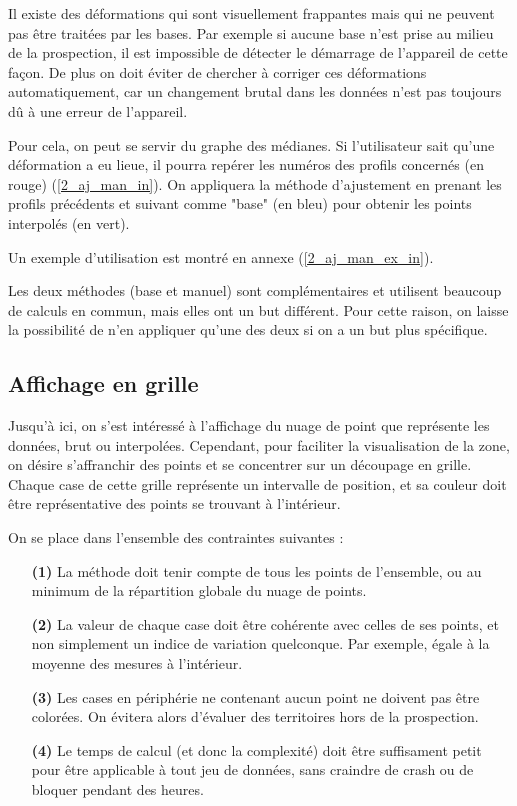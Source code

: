 \documentclass[12pt]{article}
\begin{document}
    Il existe des déformations qui sont visuellement frappantes mais qui ne peuvent pas être traitées par les bases. Par exemple si aucune base n'est prise au milieu de la prospection, il est impossible de détecter le démarrage de l'appareil de cette façon. De plus on doit éviter de chercher à corriger ces déformations automatiquement, car un changement brutal dans les données n'est pas toujours dû à une erreur de l'appareil.

    \label{2_aj_man_out} Pour cela, on peut se servir du graphe des médianes. Si l'utilisateur sait qu'une déformation a eu lieue, il pourra repérer les numéros des profils concernés (en rouge) (\ref{2_aj_man_in}). On appliquera la méthode d'ajustement en prenant les profils précédents et suivant comme "base" (en bleu) pour obtenir les points interpolés (en vert).

    \label{2_aj_man_ex_out} Un exemple d'utilisation est montré en annexe (\ref{2_aj_man_ex_in}).

    Les deux méthodes (base et manuel) sont complémentaires et utilisent beaucoup de calculs en commun, mais elles ont un but différent. Pour cette raison, on laisse la possibilité de n'en appliquer qu'une des deux si on a un but plus spécifique.

\newpage
\subsection{Affichage en grille}\label{2-3}

    Jusqu'à ici, on s'est intéressé à l'affichage du nuage de point que représente les données, brut ou interpolées. Cependant, pour faciliter la visualisation de la zone, on désire s'affranchir des points et se concentrer sur un découpage en grille. Chaque case de cette grille représente un intervalle de position, et sa couleur doit être représentative des points se trouvant à l'intérieur.

    On se place dans l'ensemble des contraintes suivantes :
    \begin{enumerate}
        \item[\textbf{(1)}] La méthode doit tenir compte de tous les points de l'ensemble, ou au minimum de la répartition globale du nuage de points.
        \item[\textbf{(2)}] La valeur de chaque case doit être cohérente avec celles de ses points, et non simplement un indice de variation quelconque. Par exemple, égale à la moyenne des mesures à l'intérieur.
        \item[\textbf{(3)}] Les cases en périphérie ne contenant aucun point ne doivent pas être colorées. On évitera alors d'évaluer des territoires hors de la prospection.
        \item[\textbf{(4)}] Le temps de calcul (et donc la complexité) doit être suffisament petit pour être applicable à tout jeu de données, sans craindre de crash ou de bloquer pendant des heures.
    \end{enumerate}
\end{document}
